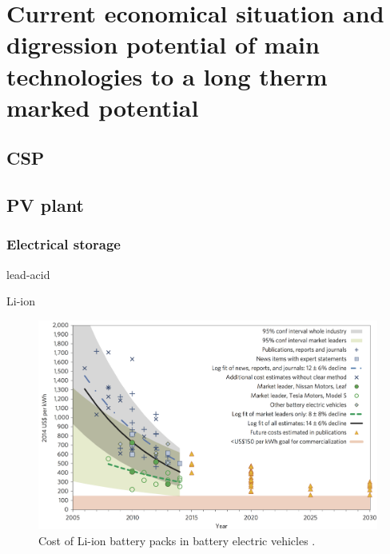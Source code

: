 \chapter{Current economical situation and digression potential of main technologies to a long therm marked potential}
\section{CSP}
\cite{Smith2012}

\section{PV plant}

\subsection{Electrical storage}
lead-acid



Li-ion\cite{Nykvist2015}

\begin{figure}[htbp]  
\centering
\includegraphics[width=0.95\linewidth]{FIG/CostofLi-ion}
\caption[Cost of Li-ion battery packs in battery electric vehicles.]{Cost of Li-ion battery packs in battery electric vehicles \cite{Nykvist2015}.}\label{CostofLi-ion}
\end{figure}

\pagebreak
